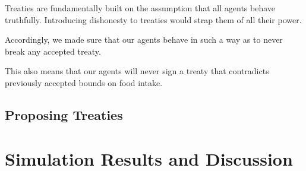 Treaties are fundamentally built on the assumption that all agents behave truthfully. Introducing dishonesty to treaties would strap them of all their power.


Accordingly, we made sure that our agents behave in such a way as to never break any accepted treaty. 

This also means that our agents will never sign a treaty that contradicts previously accepted bounds on food intake.

\subsection{Proposing Treaties}


\newpage
\section{Simulation Results and Discussion}\label{simulation_results}

